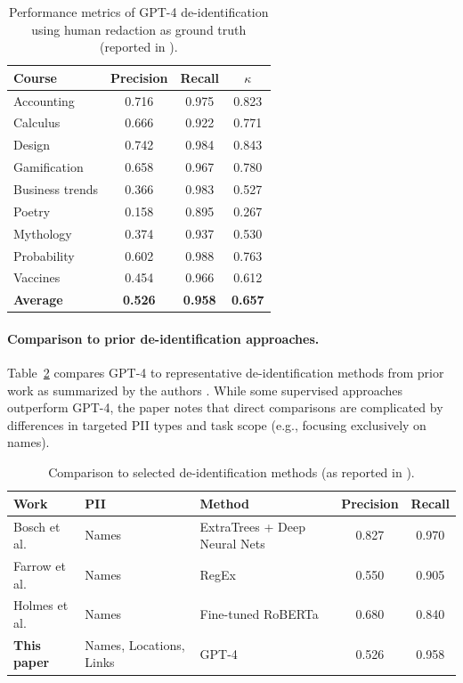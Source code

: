 \begin{table}[t]
\centering
\small
\setlength{\tabcolsep}{6pt}
\renewcommand{\arraystretch}{1.08}
\begin{tabular}{@{}l c c c@{}}
\toprule
\textbf{Course} & \textbf{Precision} & \textbf{Recall} & \textbf{$\kappa$} \\
\midrule
Accounting      & 0.716 & 0.975 & 0.823 \\
Calculus        & 0.666 & 0.922 & 0.771 \\
Design          & 0.742 & 0.984 & 0.843 \\
Gamification    & 0.658 & 0.967 & 0.780 \\
Business trends & 0.366 & 0.983 & 0.527 \\
Poetry          & 0.158 & 0.895 & 0.267 \\
Mythology       & 0.374 & 0.937 & 0.530 \\
Probability     & 0.602 & 0.988 & 0.763 \\
Vaccines        & 0.454 & 0.966 & 0.612 \\
\midrule
\textbf{Average} & \textbf{0.526} & \textbf{0.958} & \textbf{0.657} \\
\bottomrule
\end{tabular}
\caption{Performance metrics of GPT-4 de-identification using human redaction as ground truth (reported in \cite{singhal2024deid_gpt4}).}
\label{tab:deid-gpt4-metrics}
\end{table}

\paragraph{Comparison to prior de-identification approaches.}
Table~\ref{tab:deid-gpt4-compare} compares GPT-4 to representative de-identification methods from prior work as summarized
by the authors \cite{singhal2024deid_gpt4}. While some supervised approaches outperform GPT-4, the paper notes that direct
comparisons are complicated by differences in targeted PII types and task scope (e.g., focusing exclusively on names).

\begin{table}[t]
\centering
\small
\setlength{\tabcolsep}{6pt}
\renewcommand{\arraystretch}{1.10}
\begin{tabular}{@{}l l l c c@{}}
\toprule
\textbf{Work} & \textbf{PII} & \textbf{Method} & \textbf{Precision} & \textbf{Recall} \\
\midrule
Bosch et al.  & Names & ExtraTrees + Deep Neural Nets & 0.827 & 0.970 \\
Farrow et al. & Names & RegEx & 0.550 & 0.905 \\
Holmes et al. & Names & Fine-tuned RoBERTa & 0.680 & 0.840 \\
\textbf{This paper} & Names, Locations, Links & GPT-4 & 0.526 & 0.958 \\
\bottomrule
\end{tabular}
\caption{Comparison to selected de-identification methods (as reported in \cite{singhal2024deid_gpt4}).}
\label{tab:deid-gpt4-compare}
\end{table}

